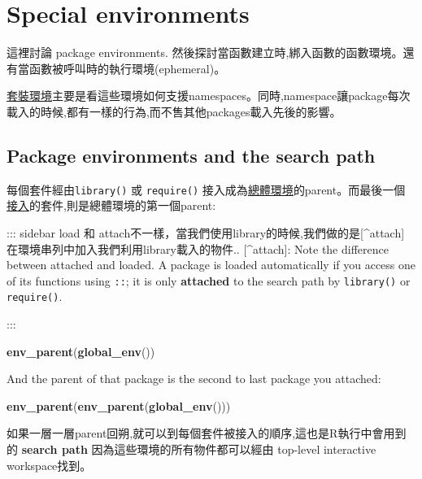\documentclass[]{book}
\newenvironment{Shaded}{\begin{snugshade}}{\end{snugshade}}
\newcommand{\KeywordTok}[1]{\textcolor[rgb]{0.13,0.29,0.53}{\textbf{#1}}}
\newcommand{\NormalTok}[1]{#1}
\theoremstyle{definition}
\theoremstyle{definition}
\theoremstyle{definition}
\theoremstyle{remark}
\begin{document}
\hypertarget{function-envs}{\section{Special
environments}\label{function-envs}}

這裡討論 package environments.
然後探討當函數建立時,綁入函數的函數環境。還有當函數被呼叫時的執行環境(ephemeral)。

\href{package-environments}{套裝環境}主要是看這些環境如何支援namespaces。同時,namespace讓package每次載入的時候,都有一樣的行為,而不售其他packages載入先後的影響。

\subsection{Package environments and the search
path}\label{package-environments-and-the-search-path}

每個套件經由\texttt{library()} 或 \texttt{require()}
接入成為\protect\hyperlink{global-environment}{總體環境}的parent。而最後一個\protect\hyperlink{attach}{接入}的套件,則是總體環境的第一個parent:

::: sidebar load 和
attach不一樣，當我們使用library的時候,我們做的是{[}\^{}attach{]}
在環境串列中加入我們利用library載入的物件.. {[}\^{}attach{]}: Note the
difference between attached and loaded. A package is loaded
automatically if you access one of its functions using \texttt{::}; it
is only \textbf{attached} to the search path by \texttt{library()} or
\texttt{require()}.

:::

\begin{Shaded}
\begin{Highlighting}[]
\KeywordTok{env_parent}\NormalTok{(}\KeywordTok{global_env}\NormalTok{())}
\end{Highlighting}
\end{Shaded}

And the parent of that package is the second to last package you
attached:

\begin{Shaded}
\begin{Highlighting}[]
\KeywordTok{env_parent}\NormalTok{(}\KeywordTok{env_parent}\NormalTok{(}\KeywordTok{global_env}\NormalTok{()))}
\end{Highlighting}
\end{Shaded}

如果一層一層parent回朔,就可以到每個套件被接入的順序,這也是R執行中會用到的
\textbf{search path} 因為這些環境的所有物件都可以經由 top-level
interactive workspace找到。
\end{document}
